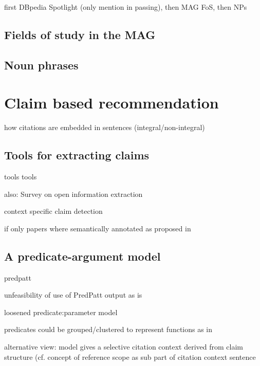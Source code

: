 first DBpedia Spotlight (only mention in passing), then MAG FoS, then NPs

\subsection{Fields of study in the MAG}

\subsection{Noun phrases}

\section{Claim based recommendation}

how citations are embedded in sentences (integral/non-integral\cite{Swales1990,Hyland1999,Thompson2001,Okamura2008,Lamers2018})

\subsection{Tools for extracting claims}
tools tools

also: Survey on open information extraction\cite{Niklaus2018}

context specific claim detection\cite{Levy2014}

if only papers where semantically annotated as proposed in \cite{BuckinghamShum2000}
\subsection{A predicate-argument model}
predpatt\cite{White2016,Zhang2017}

unfeasibility of use of PredPatt output as is

loosened predicate:parameter model

predicates could be grouped/clustered to represent functions as in \cite{Gabor2018}

alternative view: model gives a selective citation context derived from claim structure (cf. concept of reference scope as sub part of citation context sentence\cite{Abujbara2012,RAHUL2017}
